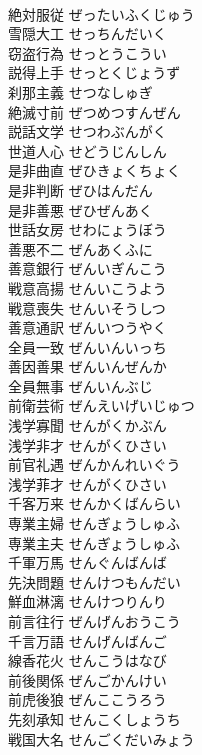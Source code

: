 \documentclass[8pt]{extreport}
\begin{document}
\begin{CJK}{UTF8}{min}
\\	絶対服従	ぜったいふくじゅう	
\\	雪隠大工	せっちんだいく	
\\	窃盗行為	せっとうこうい	
\\	説得上手	せっとくじょうず	
\\	刹那主義	せつなしゅぎ	
\\	絶滅寸前	ぜつめつすんぜん	
\\	説話文学	せつわぶんがく	
\\	世道人心	せどうじんしん	
\\	是非曲直	ぜひきょくちょく	
\\	是非判断	ぜひはんだん	
\\	是非善悪	ぜひぜんあく	
\\	世話女房	せわにょうぼう	
\\	善悪不二	ぜんあくふに	
\\	善意銀行	ぜんいぎんこう	
\\	戦意高揚	せんいこうよう	
\\	戦意喪失	せんいそうしつ	
\\	善意通訳	ぜんいつうやく	
\\	全員一致	ぜんいんいっち	
\\	善因善果	ぜんいんぜんか	
\\	全員無事	ぜんいんぶじ	
\\	前衛芸術	ぜんえいげいじゅつ	
\\	浅学寡聞	せんがくかぶん	
\\	浅学非才	せんがくひさい	
\\	前官礼遇	ぜんかんれいぐう	
\\	浅学菲才	せんがくひさい	
\\	千客万来	せんかくばんらい	
\\	専業主婦	せんぎょうしゅふ	
\\	専業主夫	せんぎょうしゅふ	
\\	千軍万馬	せんぐんばんば	
\\	先決問題	せんけつもんだい	
\\	鮮血淋漓	せんけつりんり	
\\	前言往行	ぜんげんおうこう	
\\	千言万語	せんげんばんご	
\\	線香花火	せんこうはなび	
\\	前後関係	ぜんごかんけい	
\\	前虎後狼	ぜんここうろう	
\\	先刻承知	せんこくしょうち	
\\	戦国大名	せんごくだいみょう	

\end{CJK}
\end{document}

